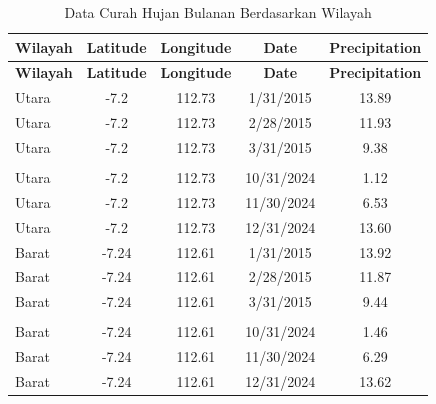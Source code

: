 \begin{longtable}{|l|c|c|c|c|}
    \caption{Data Curah Hujan Bulanan Berdasarkan Wilayah}
    \label{table:data_sekunder} \\
    \hline
    \textbf{Wilayah} & \textbf{Latitude} & \textbf{Longitude} & \textbf{Date} & \textbf{Precipitation} \\
    \hline
    \endfirsthead

    \hline
    \textbf{Wilayah} & \textbf{Latitude} & \textbf{Longitude} & \textbf{Date} & \textbf{Precipitation} \\
    \hline
    \endhead

    \hline
    \endfoot

    \hline
    \endlastfoot

    Utara  & -7.2 & 112.73 & 1/31/2015 & 13.89 \\
    Utara  & -7.2 & 112.73 & 2/28/2015 & 11.93 \\
    Utara  & -7.2 & 112.73 & 3/31/2015 & 9.38 \\
    \multicolumn{1}{|c|}{\raisebox{0.5ex}{$\vdots$}} &
    \multicolumn{1}{c|}{\raisebox{0.5ex}{$\vdots$}} &
    \multicolumn{1}{c|}{\raisebox{0.5ex}{$\vdots$}} &
    \multicolumn{1}{c|}{\raisebox{0.5ex}{$\vdots$}} &
    \multicolumn{1}{c|}{\raisebox{0.5ex}{$\vdots$}} \\  
    Utara  & -7.2 & 112.73 & 10/31/2024 & 1.12 \\
    Utara  & -7.2 & 112.73 & 11/30/2024 & 6.53 \\
    Utara  & -7.2 & 112.73 & 12/31/2024 & 13.60 \\
    \hline

    Barat  & -7.24 & 112.61 & 1/31/2015 & 13.92 \\
    Barat  & -7.24 & 112.61 & 2/28/2015 & 11.87 \\
    Barat  & -7.24 & 112.61 & 3/31/2015 & 9.44 \\
    \multicolumn{1}{|c|}{\raisebox{0.5ex}{$\vdots$}} &
    \multicolumn{1}{c|}{\raisebox{0.5ex}{$\vdots$}} &
    \multicolumn{1}{c|}{\raisebox{0.5ex}{$\vdots$}} &
    \multicolumn{1}{c|}{\raisebox{0.5ex}{$\vdots$}} &
    \multicolumn{1}{c|}{\raisebox{0.5ex}{$\vdots$}} \\  
    Barat  & -7.24 & 112.61 & 10/31/2024 & 1.46 \\
    Barat  & -7.24 & 112.61 & 11/30/2024 & 6.29 \\
    Barat  & -7.24 & 112.61 & 12/31/2024 & 13.62 \\
    \hline


\end{longtable}
